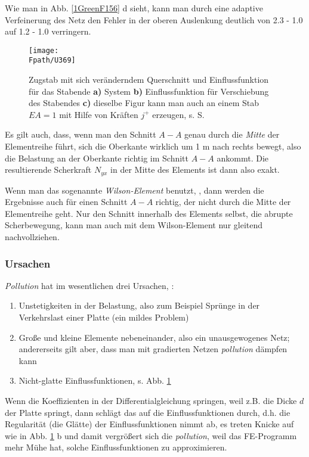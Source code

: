 {Wie man in Abb. \ref{1GreenF156} d sieht, kann man durch eine adaptive Verfeinerung des Netz den Fehler in der oberen Auslenkung deutlich von 2.3 - 1.0 auf 1.2 - 1.0 verringern.\\
\begin{figure}[tbp]
\centering
\if {} \sidecaption \fi \label{Korrektur4}
\texttt{[image: \\Fpath/U369]}
\caption{Zugstab mit sich ver\"{a}nderndem Querschnitt und Einflussfunktion f\"{u}r das Stab\-ende \textbf{ a)} System \textbf{ b)} Einflussfunktion f\"{u}r Verschiebung des Stabendes \textbf{ c)} dieselbe Figur kann man auch an einem Stab $EA = 1$ mit Hilfe von Kr\"{a}ften $j^+$ erzeugen, s. S. \pageref{jplus} } \label{U369}
\end{figure}%
Es gilt auch, dass, wenn man den Schnitt $A-A $ genau durch die {\em Mitte\/} der Elementreihe f\"{u}hrt, sich die Oberkante wirklich um 1 m nach rechts bewegt, also die Belastung an der Oberkante richtig im Schnitt $A-A$ ankommt. Die resultierende Scherkraft $N_{yx}$ in der Mitte des Elements ist dann also exakt.

Wenn man das sogenannte {\em Wilson-Element\/} benutzt, \cite{Ha5}, dann werden die Ergebnisse auch f\"{u}r einen Schnitt $A-A $ richtig, der nicht durch die Mitte der Elementreihe geht. Nur den Schnitt innerhalb des Elements selbst, die abrupte Scherbewegung, kann man auch mit dem Wilson-Element nur \glq gleitend\grq{} nachvollziehen.

{\textcolor{sectionTitleBlue}{\subsubsection*{Ursachen}}}
{\em Pollution\/} hat im wesentlichen drei Ursachen, \cite{Babuska5}:\\

\begin{enumerate}
  \item Unstetigkeiten in der Belastung, also zum Beispiel Spr\"{u}nge in der Verkehrslast einer Platte (ein mildes Problem)
  \item Gro{\ss}e und kleine Elemente nebeneinander, also ein unausgewogenes Netz; andererseits gilt aber, dass man mit gradierten Netzen {\em pollution\/} d\"{a}mpfen kann
  \item Nicht-glatte Einflussfunktionen, s. Abb. \ref{U369}
\end{enumerate}
Wenn die Koeffizienten in der Differentialgleichung springen, weil z.B. die Dicke $d$ der Platte springt, dann schl\"{a}gt das auf die Einflussfunktionen durch, d.h. die Regularit\"{a}t (\glq die Gl\"{a}tte\grq{}) der Einflussfunktionen nimmt ab, es treten Knicke auf wie in Abb. \ref{U369} b und damit vergr\"{o}{\ss}ert sich die {\em pollution\/}, weil das FE-Programm mehr M\"{u}he hat, solche Einflussfunktionen zu approximieren.

}
